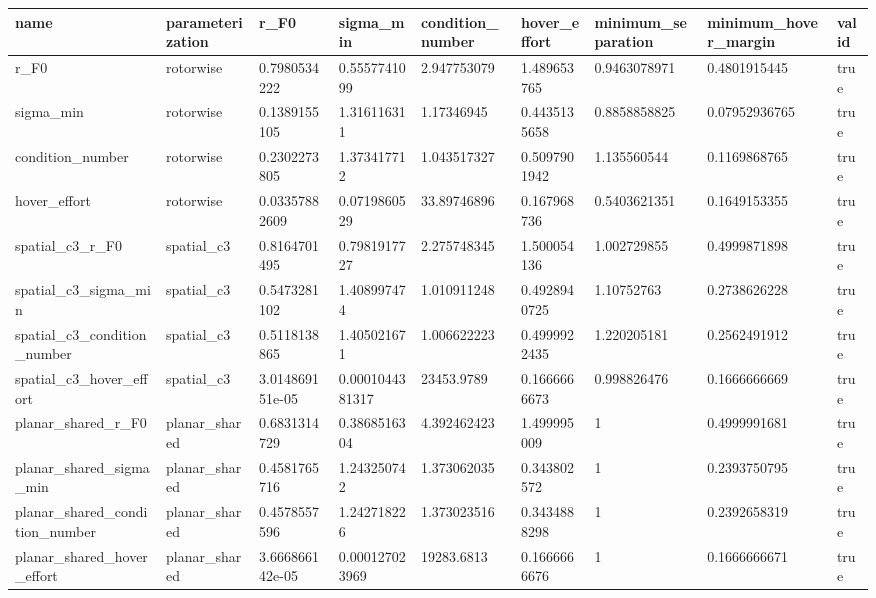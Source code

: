 \begin{tabular}{@{}lllllllll@{}}
\toprule
name & parameterization & r\_F0 & sigma\_min & condition\_number & hover\_effort & minimum\_separation & minimum\_hover\_margin & valid \\
\midrule
r\_F0 & rotorwise & 0.7980534222 & 0.5557741099 & 2.947753079 & 1.489653765 & 0.9463078971 & 0.4801915445 & true \\
sigma\_min & rotorwise & 0.1389155105 & 1.316116311 & 1.17346945 & 0.4435135658 & 0.8858858825 & 0.07952936765 & true \\
condition\_number & rotorwise & 0.2302273805 & 1.373417712 & 1.043517327 & 0.5097901942 & 1.135560544 & 0.1169868765 & true \\
hover\_effort & rotorwise & 0.03357882609 & 0.0719860529 & 33.89746896 & 0.167968736 & 0.5403621351 & 0.1649153355 & true \\
spatial\_c3\_r\_F0 & spatial\_c3 & 0.8164701495 & 0.7981917727 & 2.275748345 & 1.500054136 & 1.002729855 & 0.4999871898 & true \\
spatial\_c3\_sigma\_min & spatial\_c3 & 0.5473281102 & 1.408997474 & 1.010911248 & 0.4928940725 & 1.10752763 & 0.2738626228 & true \\
spatial\_c3\_condition\_number & spatial\_c3 & 0.5118138865 & 1.405021671 & 1.006622223 & 0.4999922435 & 1.220205181 & 0.2562491912 & true \\
spatial\_c3\_hover\_effort & spatial\_c3 & 3.014869151e-05 & 0.0001044381317 & 23453.9789 & 0.1666666673 & 0.998826476 & 0.1666666669 & true \\
planar\_shared\_r\_F0 & planar\_shared & 0.6831314729 & 0.3868516304 & 4.392462423 & 1.499995009 & 1 & 0.4999991681 & true \\
planar\_shared\_sigma\_min & planar\_shared & 0.4581765716 & 1.243250742 & 1.373062035 & 0.343802572 & 1 & 0.2393750795 & true \\
planar\_shared\_condition\_number & planar\_shared & 0.4578557596 & 1.242718226 & 1.373023516 & 0.3434888298 & 1 & 0.2392658319 & true \\
planar\_shared\_hover\_effort & planar\_shared & 3.666866142e-05 & 0.000127023969 & 19283.6813 & 0.1666666676 & 1 & 0.1666666671 & true \\
\bottomrule
\end{tabular}
